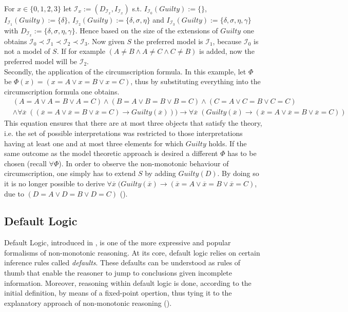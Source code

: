 \documentclass{extarticle}
\begin{document}
For $x\in \{0,1,2,3\}$ let $\mathcal{I}_x:=(D_{\mathcal{I}_x}, I_{\mathcal{I}_x})$ s.t. $I_{\mathcal{I}_0}(Guilty):=\{\}$, $I_{\mathcal{I}_1}(Guilty):=\{\delta\}$,  $I_{\mathcal{I}_2}(Guilty):=\{\delta, \sigma, \eta\}$ and $I_{\mathcal{I}_3}(Guilty):=\{\delta, \sigma, \eta, \gamma\}$ with $D_{\mathcal{I}_x}:=\{\delta, \sigma, \eta, \gamma\}$.
Hence based on the size of the extensions of $Guilty$ one obtains $\mathcal{I}_0 \prec \mathcal{I}_1 \prec \mathcal{I}_2 \prec \mathcal{I}_3 $. 
Now given $S$ the preferred model is $\mathcal{I}_1$, because $\mathcal{I}_0$ is not a model of $S$. If for example $(A \neq B \wedge A \neq C \wedge C \neq B)$ is added, now the preferred model will be $\mathcal{I}_2$.\\

Secondly, the application of the circumscription formula. In this example, let $\Phi$ be $\Phi(x) = (x=A \vee x=B \vee x=C)$, thus by substituting everything into the circumscription formula one obtains.
\begin{equation*}
\begin{split}
&(A=A \vee A=B \vee A=C)\wedge (B=A \vee B=B \vee B=C) \wedge (C=A \vee C=B \vee C=C) \\
& \wedge \forall \overline{x} \; ((\overline{x}=A \vee \overline{x}=B \vee \overline{x}=C)\to Guilty(\overline{x})))  \to  \forall \overline{x} \; (Guilty(\overline{x})   \to  (\overline{x}=A \vee \overline{x}=B \vee \overline{x}=C))
\end{split}
\end{equation*} 
This equation ensures that there are at most three objects that satisfy the theory, i.e. the set of possible interpretations was restricted to those interpretations having at least one and at most three elements for which $Guilty$ holds. If the same outcome as the model theoretic approach is desired a different $\Phi$ has to be chosen (recall $\forall \Phi$). In order to observe the non-monotonic behaviour of circumscription, one simply has to extend $S$ by adding $Guilty(D)$. By doing so it is no longer possible to derive $\forall \overline{x} \; (Guilty(\overline{x})   \to  (\overline{x}=A \vee \overline{x}=B \vee \overline{x}=C )$, due to $(D=A \vee D=B \vee D=C)$ (\cite{mccarthy1981circumscription}). \\



\subsection{Default Logic}
Default Logic, introduced in \cite{reiter1980logic}, is one of the more expressive and popular formalisms of non-monotonic reasoning. At its core, default logic relies on certain inference rules called \emph{defaults}. These defaults can be understood as rules of thumb that enable the reasoner to jump to conclusions given incomplete information. Moreover, reasoning within default logic is done, according to the initial definition, by means of a fixed-point opertion, thus tying it to the explanatory approach of non-monotonic reasoning (\cite{BOCHMAN2007557, ANTONIOU2007517}). \\
\end{document}

